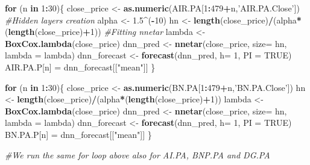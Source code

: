 \documentclass[
  11pt,
]{article}
\newenvironment{Shaded}{\begin{snugshade}}{\end{snugshade}}
\newcommand{\CommentTok}[1]{\textcolor[rgb]{0.56,0.35,0.01}{\textit{#1}}}
\newcommand{\ControlFlowTok}[1]{\textcolor[rgb]{0.13,0.29,0.53}{\textbf{#1}}}
\newcommand{\DataTypeTok}[1]{\textcolor[rgb]{0.13,0.29,0.53}{#1}}
\newcommand{\DecValTok}[1]{\textcolor[rgb]{0.00,0.00,0.81}{#1}}
\newcommand{\FloatTok}[1]{\textcolor[rgb]{0.00,0.00,0.81}{#1}}
\newcommand{\KeywordTok}[1]{\textcolor[rgb]{0.13,0.29,0.53}{\textbf{#1}}}
\newcommand{\NormalTok}[1]{#1}
\newcommand{\OperatorTok}[1]{\textcolor[rgb]{0.81,0.36,0.00}{\textbf{#1}}}
\newcommand{\OtherTok}[1]{\textcolor[rgb]{0.56,0.35,0.01}{#1}}
\newcommand{\StringTok}[1]{\textcolor[rgb]{0.31,0.60,0.02}{#1}}
\begin{document}
\begin{Shaded}
\begin{Highlighting}[]
\ControlFlowTok{for}\NormalTok{ (n }\ControlFlowTok{in} \DecValTok{1}\OperatorTok{:}\DecValTok{30}\NormalTok{)\{}
\NormalTok{  close_price <-}\StringTok{ }\KeywordTok{as.numeric}\NormalTok{(AIR.PA[}\DecValTok{1}\OperatorTok{:}\DecValTok{479}\OperatorTok{+}\NormalTok{n,}\StringTok{'AIR.PA.Close'}\NormalTok{])}
\CommentTok{#Hidden layers creation}
\NormalTok{  alpha <-}\StringTok{ }\FloatTok{1.5}\OperatorTok{^}\NormalTok{(}\OperatorTok{-}\DecValTok{10}\NormalTok{) }
\NormalTok{  hn <-}\StringTok{ }\KeywordTok{length}\NormalTok{(close_price)}\OperatorTok{/}\NormalTok{(alpha}\OperatorTok{*}\NormalTok{(}\KeywordTok{length}\NormalTok{(close_price)}\OperatorTok{+}\DecValTok{1}\NormalTok{))}
\CommentTok{#Fitting nnetar}
\NormalTok{  lambda <-}\StringTok{ }\KeywordTok{BoxCox.lambda}\NormalTok{(close_price)}
\NormalTok{  dnn_pred <-}\StringTok{ }\KeywordTok{nnetar}\NormalTok{(close_price, }\DataTypeTok{size=}\NormalTok{ hn, }\DataTypeTok{lambda =}\NormalTok{ lambda) }
\NormalTok{  dnn_forecast <-}\StringTok{ }\KeywordTok{forecast}\NormalTok{(dnn_pred, }\DataTypeTok{h=} \DecValTok{1}\NormalTok{, }\DataTypeTok{PI =} \OtherTok{TRUE}\NormalTok{)   }
\NormalTok{  AIR.PA.P[n] =}\StringTok{ }\NormalTok{dnn_forecast[[}\StringTok{"mean"}\NormalTok{]] }
\NormalTok{\}}

\ControlFlowTok{for}\NormalTok{ (n }\ControlFlowTok{in} \DecValTok{1}\OperatorTok{:}\DecValTok{30}\NormalTok{)\{}
\NormalTok{   close_price <-}\StringTok{ }\KeywordTok{as.numeric}\NormalTok{(BN.PA[}\DecValTok{1}\OperatorTok{:}\DecValTok{479}\OperatorTok{+}\NormalTok{n,}\StringTok{'BN.PA.Close'}\NormalTok{])}
\NormalTok{   hn <-}\StringTok{ }\KeywordTok{length}\NormalTok{(close_price)}\OperatorTok{/}\NormalTok{(alpha}\OperatorTok{*}\NormalTok{(}\KeywordTok{length}\NormalTok{(close_price)}\OperatorTok{+}\DecValTok{1}\NormalTok{))}
\NormalTok{   lambda <-}\StringTok{ }\KeywordTok{BoxCox.lambda}\NormalTok{(close_price)}
\NormalTok{   dnn_pred <-}\StringTok{ }\KeywordTok{nnetar}\NormalTok{(close_price, }\DataTypeTok{size=}\NormalTok{ hn, }\DataTypeTok{lambda =}\NormalTok{ lambda)}
\NormalTok{   dnn_forecast <-}\StringTok{ }\KeywordTok{forecast}\NormalTok{(dnn_pred, }\DataTypeTok{h=} \DecValTok{1}\NormalTok{, }\DataTypeTok{PI =} \OtherTok{TRUE}\NormalTok{)}
\NormalTok{   BN.PA.P[n] =}\StringTok{ }\NormalTok{dnn_forecast[[}\StringTok{"mean"}\NormalTok{]]}
\NormalTok{ \}}
 
 \CommentTok{#We run the same for loop above also for AI.PA, BNP.PA and DG.PA}
\end{Highlighting}
\end{Shaded}
\end{document}

